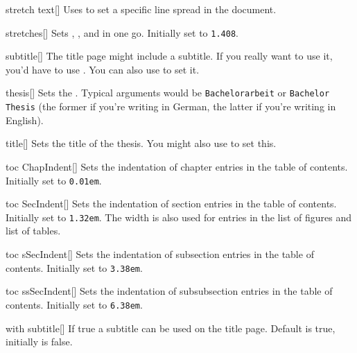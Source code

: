 \begin{describeopt}{stretch text}[]
  Uses  to set a specific line spread in the document.
\end{describeopt}
\begin{describeopt}{stretches}[]
  Sets , , and  in one go.
  Initially set to \texttt{1.408}.
\end{describeopt}
\begin{describeopt}{subtitle}[]
  The title page might include a subtitle. If you really want to use it, you'd
  have to use . You can also use  to set it.
\end{describeopt}
\begin{describeopt}{thesis}[]
  Sets the . Typical arguments would be
  \texttt{Bachelorarbeit} or \texttt{Bachelor Thesis} (the former if you're
  writing in German, the latter if you're writing in English).
\end{describeopt}
\begin{describeopt}{title}[]
  Sets the title of the thesis. You might also use  to set this.
\end{describeopt}
\begin{describeopt}{toc ChapIndent}[]
  Sets the indentation of chapter entries in the table of contents. Initially
  set to \texttt{0.01em}.
\end{describeopt}
\begin{describeopt}{toc SecIndent}[]
  Sets the indentation of section entries in the table of contents. Initially
  set to \texttt{1.32em}. The width is also used for entries in the list of
  figures and list of tables.
\end{describeopt}
\begin{describeopt}{toc sSecIndent}[]
  Sets the indentation of subsection entries in the table of contents. Initially
  set to \texttt{3.38em}.
\end{describeopt}
\begin{describeopt}{toc ssSecIndent}[]
  Sets the indentation of subsubsection entries in the table of contents.
  Initially set to \texttt{6.38em}.
\end{describeopt}
\begin{describeopt}{with subtitle}[]
  If true a subtitle can be used on the title page. Default is true, initially
  is false.
\end{describeopt}

